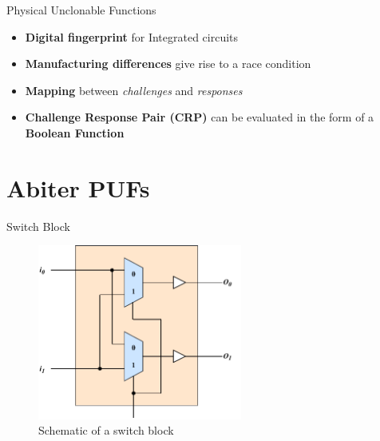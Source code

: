 \documentclass[10pt, compress]{beamer}
\begin{document}
\begin{frame}{Physical Unclonable Functions}
    \begin{itemize}[itemsep=0.5cm]
        \item \textbf{Digital fingerprint} for Integrated circuits
        \item \textbf{Manufacturing differences} give rise to a race condition
        \item \textbf{Mapping} between \textit{challenges} and \textit{responses}
        \item \textbf{Challenge Response Pair (CRP)} can be evaluated in the form of a \textbf{Boolean Function}
    \end{itemize}
\end{frame}

\section{Abiter PUFs} %

\begin{frame}{Switch Block}
    \begin{figure}
        \centering
        \includegraphics[width=0.6\textwidth]{figures/switch_block_detailed.pdf}
        \caption{Schematic of a switch block}
    \end{figure}
\end{frame}
\end{document}

